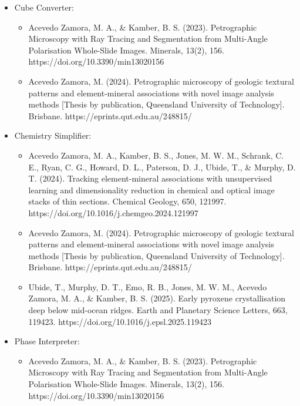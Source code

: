 	\begin{itemize}
		
		\item Cube Converter:	
		
			\begin{itemize}				
				\item Acevedo Zamora, M. A., \& Kamber, B. S. (2023). Petrographic Microscopy with Ray Tracing and Segmentation from Multi-Angle Polarisation Whole-Slide Images. Minerals, 13(2), 156. https://doi.org/10.3390/min13020156
				
				\item Acevedo Zamora, M. (2024). Petrographic microscopy of geologic textural patterns and element-mineral associations with novel image analysis methods [Thesis by publication, Queensland University of Technology]. Brisbane. https://eprints.qut.edu.au/248815/
			\end{itemize}
		
		\item Chemistry Simplifier:	
		
			\begin{itemize}
				\item Acevedo Zamora, M. A., Kamber, B. S., Jones, M. W. M., Schrank, C. E., Ryan, C. G., Howard, D. L., Paterson, D. J., Ubide, T., \& Murphy, D. T. (2024). Tracking element-mineral associations with unsupervised learning and dimensionality reduction in chemical and optical image stacks of thin sections. Chemical Geology, 650, 121997. https://doi.org/10.1016/j.chemgeo.2024.121997
				
				\item Acevedo Zamora, M. (2024). Petrographic microscopy of geologic textural patterns and element-mineral associations with novel image analysis methods [Thesis by publication, Queensland University of Technology]. Brisbane. https://eprints.qut.edu.au/248815/
				
				\item Ubide, T., Murphy, D. T., Emo, R. B., Jones, M. W. M., Acevedo Zamora, M. A., \& Kamber, B. S. (2025). Early pyroxene crystallisation deep below mid-ocean ridges. Earth and Planetary Science Letters, 663, 119423. https://doi.org/10.1016/j.epsl.2025.119423
						
			\end{itemize}
		
		\item Phase Interpreter:	
		
			\begin{itemize}
				\item Acevedo Zamora, M. A., \& Kamber, B. S. (2023). Petrographic Microscopy with Ray Tracing and Segmentation from Multi-Angle Polarisation Whole-Slide Images. Minerals, 13(2), 156. https://doi.org/10.3390/min13020156
				

\end{itemize}
\end{itemize}
